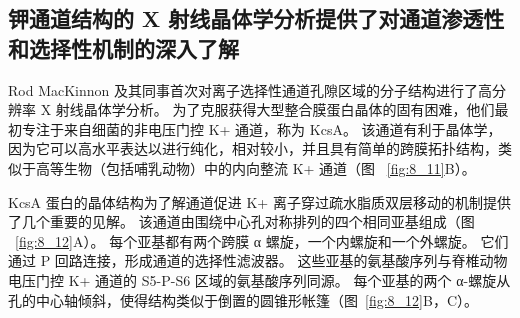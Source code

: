 \subsection{钾通道结构的 X 射线晶体学分析提供了对通道渗透性和选择性机制的深入了解}

Rod MacKinnon 及其同事首次对离子选择性通道孔隙区域的分子结构进行了高分辨率 X 射线晶体学分析。
为了克服获得大型整合膜蛋白晶体的固有困难，他们最初专注于来自细菌的非电压门控 K+ 通道，称为 KcsA。 
该通道有利于晶体学，因为它可以高水平表达以进行纯化，相对较小，并且具有简单的跨膜拓扑结构，类似于高等生物（包括哺乳动物）中的内向整流 K+ 通道（图 ~\ref{fig:8_11}B）。


KcsA 蛋白的晶体结构为了解通道促进 K+ 离子穿过疏水脂质双层移动的机制提供了几个重要的见解。
该通道由围绕中心孔对称排列的四个相同亚基组成（图 ~\ref{fig:8_12}A）。
每个亚基都有两个跨膜 α 螺旋，一个内螺旋和一个外螺旋。
它们通过 P 回路连接，形成通道的选择性滤波器。
这些亚基的氨基酸序列与脊椎动物电压门控 K+ 通道的 S5-P-S6 区域的氨基酸序列同源。
每个亚基的两个 α-螺旋从孔的中心轴倾斜，使得结构类似于倒置的圆锥形帐篷（图~\ref{fig:8_12}B，C）。


